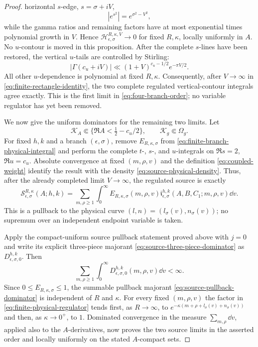 \begin{proof}
horizontal $s$-edge, $s=\sigma+iV$,
\[
                         |e^{s^2}|=e^{\sigma^2-V^2},
\]
while the gamma ratios and remaining factors have at most exponential times
polynomial growth in $V$.  Hence
$\mathscr H_{\epsilon,\sigma}^{R,\kappa,V}\to0$ for fixed $R,\kappa$,
locally uniformly in $A$.  No $u$-contour is moved in this proposition.
After the complete $s$-lines have been restored, the vertical $u$-tails are
controlled by Stirling:
\[
 |\Gamma(c_u+iV)|\ll(1+V)^{c_u-1/2}e^{-\pi V/2}.
\]
All other $u$-dependence is polynomial at fixed $R,\kappa$.  Consequently,
after $V\to\infty$ in \eqref{eq:finite-rectangle-identity}, the two complete
regulated vertical-contour integrals agree exactly.  This is the first limit
in \eqref{eq:four-branch-order}; no variable regulator has yet been removed.

We now give the uniform dominators for the remaining two limits.  Let
\begin{equation}\label{eq:source-compact-sets}
 \mathscr K_A\Subset\{\Re A<\tfrac12-c_u/2\},\qquad
 \mathscr K_g\Subset\Omega_g.
\end{equation}
For fixed $h,k$ and a branch $(\epsilon,\sigma)$, remove
$E_{R,\kappa,\sigma}$ from \eqref{eq:finite-branch-physical-integral} and
perform the complete $t$-, $s$-, and $u$-integrals on
$\Re s=2$, $\Re u=c_u$.  Absolute convergence at fixed $(m,\rho,v)$ and
the definition \eqref{eq:coupled-weight} identify the result with the density
\eqref{eq:source-physical-density}.  Thus, after the already completed limit
$V\to\infty$, the regulated source is exactly
\begin{equation}\label{eq:source-as-pullback}
 \mathscr S_{\epsilon,\sigma}^{R,\kappa}(A;h,k)
 =\sum_{m,\rho\geq1}\int_0^\infty
 E_{R,\kappa,\sigma}(m,\rho,v)
 \mathfrak i_{\epsilon,\sigma}^{h,k}
 (A,B,C_1;m,\rho,v)\dd v .
\end{equation}
This is a pullback to the physical curve
$(l,n)=(l_\sigma(v),n_\sigma(v))$; no supremum over an independent endpoint
variable is taken.

Apply the compact-uniform source pullback statement proved above with $j=0$
and write its explicit three-piece majorant
\eqref{eq:source-three-piece-dominator} as
$D_{\epsilon,\sigma,0}^{h,k}$.  Then
\begin{equation}\label{eq:source-pullback-dominator}
 \sum_{m,\rho\geq1}\int_0^\infty
 D_{\epsilon,\sigma,0}^{h,k}(m,\rho,v)\dd v<\infty .
\end{equation}
Since $0\leq E_{R,\kappa,\sigma}\leq1$, the summable pullback majorant
\eqref{eq:source-pullback-dominator} is independent of $R$ and $\kappa$.
For every fixed $(m,\rho,v)$ the factor in
\eqref{eq:finite-physical-regulator} tends first, as $R\to\infty$, to
$e^{-\kappa(m+\rho+l_\sigma(v)+n_\sigma(v))}$ and then, as
$\kappa\to0^+$, to $1$.  Dominated convergence in the measure
$\sum_{m,\rho}\dd v$, applied also to the $A$-derivatives, now proves the two
source limits in the asserted order and locally uniformly on the stated
$A$-compact sets.


\end{proof}
